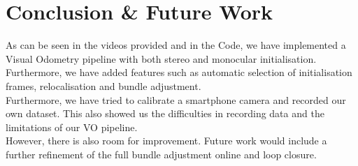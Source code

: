 \section{Conclusion \& Future Work}

As can be seen in the videos provided and in the Code, we have implemented a Visual Odometry pipeline with both stereo and monocular initialisation. Furthermore, we have added features such as automatic selection of initialisation frames, relocalisation and bundle adjustment. \\
Furthermore, we have tried to calibrate a smartphone camera and recorded our own dataset. This also showed us the difficulties in recording data and the limitations of our VO pipeline. \\
However, there is also room for improvement. Future work would include a further refinement of the full bundle adjustment online and loop closure. 
